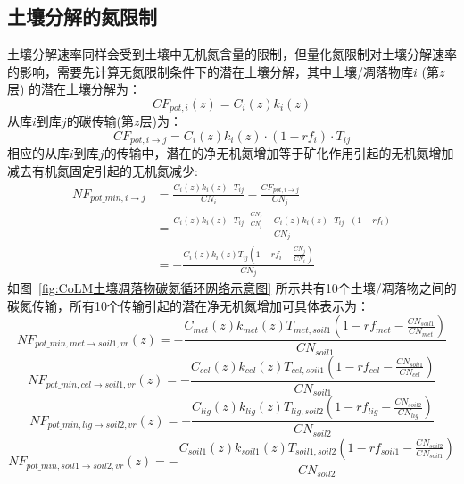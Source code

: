 \subsection{土壤分解的氮限制}\label{土壤分解的氮限制}
土壤分解速率同样会受到土壤中无机氮含量的限制，但量化氮限制对土壤分解速率的影响，需要先计算无氮限制条件下的潜在土壤分解，其中土壤/凋落物库$i$ (第$z$层) 的潜在土壤分解为：
\begin{equation}
C F_{pot, i}(z)=C_{i}(z) k_{i}(z)
\end{equation}
从库$i$到库$j$的碳传输(第$z$层)为：
\begin{equation}
C F_{pot, i \rightarrow j}=C_{i}(z) k_{i}(z) \cdot\left(1-r f_{i}\right) \cdot T_{i j}
\end{equation}
相应的从库$i$到库$j$的传输中，潜在的净无机氮增加等于矿化作用引起的无机氮增加减去有机氮固定引起的无机氮减少:
\begin{equation}
\begin{aligned}
NF_{pot\_{min, i \rightarrow j}}&=\frac{C_{i}(z) k_{i}(z) \cdot T_{ij}}{C N_{i}}-\frac{C F_{pot, i \rightarrow j}}{C N_{j}} \\
& =\frac{C_{i}(z) k_{i}(z) \cdot T_{i j} \cdot \frac{C N_{j}}{C N_{i}}-C_{i}(z) k_{i}(z) \cdot T_{i j} \cdot\left(1-r f_{i}\right)}{C N_{j}} \\
&=-\frac{C_{i}(z) k_{i}(z) T_{i j}\left(1-r f_{i}-\frac{C N_{j}}{C N_{i}}\right)}{C N_{j}}
\end{aligned}
\end{equation}
如图~\ref{fig:CoLM土壤凋落物碳氮循环网络示意图} 所示共有10个土壤/凋落物之间的碳氮传输，所有10个传输引起的潜在净无机氮增加可具体表示为：
\begin{equation}\label{NF_pot_minmet}
    NF_{{pot}\_{min,met \rightarrow {soil1,vr}}}(z)=-\frac{C_{{met}}(z) k_{{met}}(z) T_{met, soil1}\left(1-r f_{met}-\frac{C N_{{soil1 }}}{C N_{met}}\right)}{C N_{{soil1 }}}
\end{equation}
\begin{equation}
    NF_{pot\_{min,cel \rightarrow {soil1,vr }}}(z)=-\frac{C_{cel}(z) k_{cel}(z) T_{cel, soil1}\left(1-r f_{cel}-\frac{C N_{{soil 1}}}{C N_{cel}}\right)}{C N_{{soil1}}}
\end{equation}
\begin{equation}
    NF_{pot\_{min,lig \rightarrow {soil2,vr}}}(z)=-\frac{C_{lig}(z) k_{lig}(z) T_{lig, soil2}\left(1-r f_{lig}-\frac{C N_{{soil2 }}}{C N_{lig}}\right)}{C N_{{soil2 }}}
\end{equation}
\begin{equation}
    NF_{pot\_{min,soil1\rightarrow {soil2,vr}}}(z)=-\frac{C_{soil1}\left(z\right)k_{soil1}\left(z\right)T_{soil1,soil2}\left(1-rf_{soil1}-\frac{CN_{soil2}}{CN_{soil1}}\right)}{CN_{soil2}}
\end{equation}
